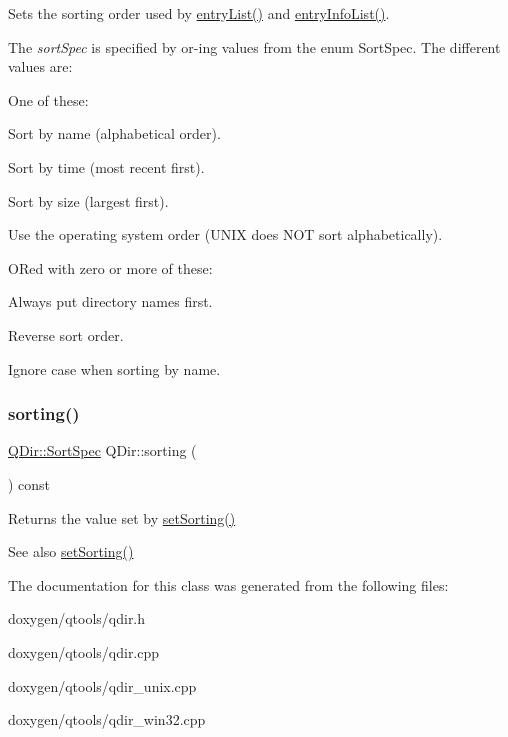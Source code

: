 Sets the sorting order used by \mbox{\hyperlink{class_q_dir_ab5e2b4ce772dc4b8941425cf780df9ab}{entry\+List()}} and \mbox{\hyperlink{class_q_dir_ada9ea9da108cbebd0ac88231f39fced0}{entry\+Info\+List()}}.

The {\itshape sort\+Spec} is specified by or-\/ing values from the enum Sort\+Spec. The different values are\+:

One of these\+: 
\begin{DoxyDescription}
\item[Name]Sort by name (alphabetical order). 
\item[Time]Sort by time (most recent first). 
\item[Size]Sort by size (largest first). 
\item[Unsorted]Use the operating system order (U\+N\+IX does N\+OT sort alphabetically).

O\+Red with zero or more of these\+:


\item[Dirs\+First]Always put directory names first. 
\item[Reversed]Reverse sort order. 
\item[Ignore\+Case]Ignore case when sorting by name. 
\end{DoxyDescription}\mbox{\label{class_q_dir_a389b638c7f9f89b84795ae76ad365360}} 
\subsubsection{\texorpdfstring{sorting()}{sorting()}}
{\footnotesize\ttfamily \mbox{\hyperlink{class_q_dir_a428a858abe9593efc498b6641b41994c}{Q\+Dir\+::\+Sort\+Spec}} Q\+Dir\+::sorting (\begin{DoxyParamCaption}{ }\end{DoxyParamCaption}) const\hspace{0.3cm}{\ttfamily [inline]}}

Returns the value set by \mbox{\hyperlink{class_q_dir_a65280d204cd65975953e3eb2a63da778}{set\+Sorting()}}

\begin{DoxySeeAlso}{See also}
\mbox{\hyperlink{class_q_dir_a65280d204cd65975953e3eb2a63da778}{set\+Sorting()}} 
\end{DoxySeeAlso}


The documentation for this class was generated from the following files\+:\begin{DoxyCompactItemize}
\item 
doxygen/qtools/qdir.\+h\item 
doxygen/qtools/qdir.\+cpp\item 
doxygen/qtools/qdir\+\_\+unix.\+cpp\item 
doxygen/qtools/qdir\+\_\+win32.\+cpp\end{DoxyCompactItemize}
